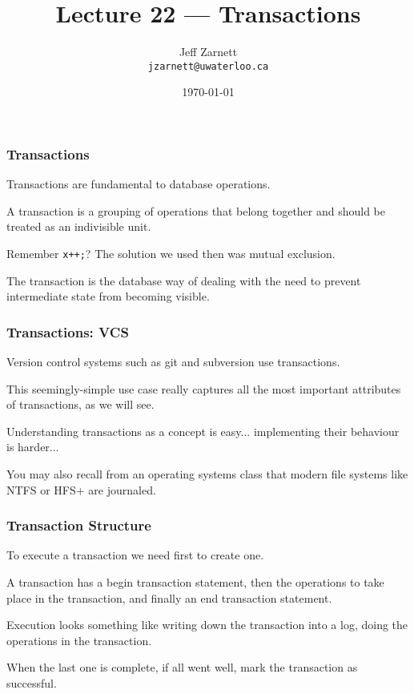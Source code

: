 

\title{Lecture 22 --- Transactions }

\author{Jeff Zarnett \\ \small \texttt{jzarnett@uwaterloo.ca}}
\date{\today}




\begin{frame}
  \titlepage

 \end{frame}


\begin{frame}
\frametitle{Transactions}

Transactions are fundamental to database operations. 

A transaction is a grouping of operations that belong together and should be treated as an indivisible unit. 

Remember \texttt{x++;}? The solution we used then was mutual exclusion.

The transaction is the database way of dealing with the need to prevent intermediate state from becoming visible.


\end{frame}

\begin{frame}
\frametitle{Transactions: VCS}

Version control systems such as git and subversion use transactions. 

This seemingly-simple use case really captures all the most important attributes of transactions, as we will see. 

Understanding transactions as a concept is easy... implementing their behaviour is harder...

You may also recall from an operating systems class that modern file systems like NTFS or HFS+ are journaled. 

\end{frame}

\begin{frame}
\frametitle{Transaction Structure}
To execute a transaction we need first to create one. 

A transaction has a begin transaction statement, then the operations to take place in the transaction, and finally an end transaction statement. 

Execution looks something like writing down the transaction into a log, doing the operations in the transaction. 

When the last one is complete, if all went well, mark the transaction as successful. 


\end{frame}

